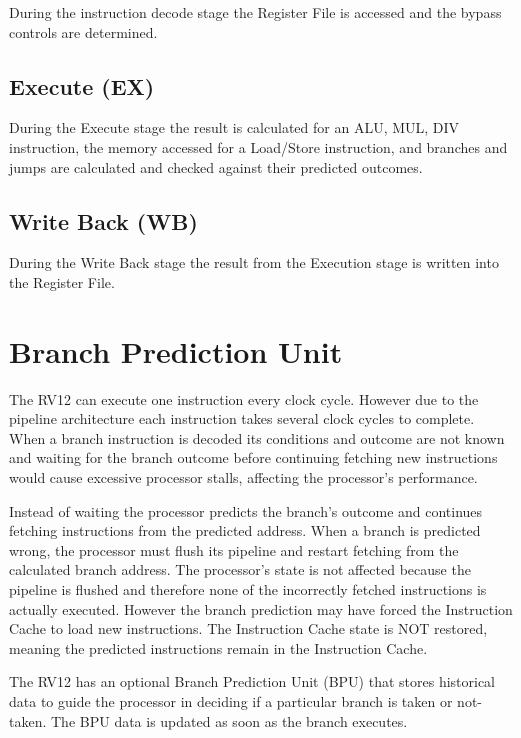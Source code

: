 During the instruction decode stage the Register File is accessed and the bypass controls are determined.

\subsection{Execute (EX)} \label{execute-ex}

During the Execute stage the result is calculated for an ALU, MUL, DIV instruction, the memory accessed for a Load/Store instruction, and branches and jumps are calculated and checked against their predicted outcomes.

\subsection{Write Back (WB)} \label{write-back-wb}

During the Write Back stage the result from the Execution stage is written into the Register File.

\section{Branch Prediction Unit} \label{branch-prediction-unit}

The RV12 can execute one instruction every clock cycle. 
However due to the pipeline architecture each instruction takes several clock cycles to complete. 
When a branch instruction is decoded its conditions and outcome are not known and waiting for the branch outcome before continuing fetching new instructions would cause excessive processor stalls, affecting the processor's performance.

Instead of waiting the processor predicts the branch's outcome and continues fetching instructions from the predicted address.
When a branch is predicted wrong, the processor must flush its pipeline and restart fetching from the calculated branch address. 
The processor's state is not affected because the pipeline is flushed and therefore none of the incorrectly fetched instructions is actually executed. 
However the branch prediction may have forced the Instruction Cache to load new instructions. 
The Instruction Cache state is NOT restored, meaning the predicted instructions remain in the Instruction Cache.

The RV12 has an optional Branch Prediction Unit (BPU) that stores historical data to guide the processor in deciding if a particular branch is taken or not-taken. 
The BPU data is updated as soon as the branch executes.

